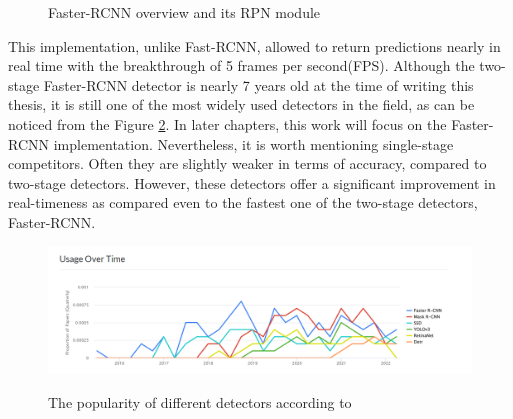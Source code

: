 \documentclass[english, 12pt, a4paper, elec, utf8, a-1b, online]{aaltothesis}
\begin{document}
\begin{figure}[htb]
    \centering
    \qquad
    \caption{Faster-RCNN overview and its RPN module}\cite{ima}
    \label{fig:faster_rcnn}%
\end{figure}
\FloatBarrier
This implementation, unlike Fast-RCNN, allowed to return predictions nearly in real time with the breakthrough of 5 frames per second(FPS)\cite{ima}.
Although the two-stage Faster-RCNN detector is nearly 7 years old at the time of writing this thesis, it is still one of the most widely used detectors in the field, as can be noticed from the Figure \ref{popularity}. In later chapters, this work will focus on the Faster-RCNN implementation. Nevertheless, it is worth mentioning single-stage competitors. Often they are slightly weaker in terms of accuracy, compared to two-stage detectors. However, these detectors offer a significant improvement in real-timeness as compared even to the fastest one of the two-stage detectors, Faster-RCNN. 

\begin{figure}[htb]
	\begin{center}
		\includegraphics[width=14cm]{./detectorsPopularity.png}
	\end{center}
	\caption{The popularity of different detectors according to \cite{paperswithcode_1:2022}}
	\begin{center}
		\label{popularity}
	\end{center}
\end{figure}
\FloatBarrier
\end{document}
